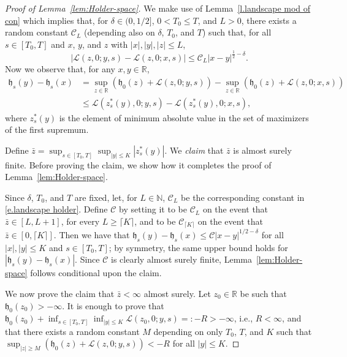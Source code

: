 \documentclass[oneside,final,11pt]{amsart}
\theoremstyle{definition}
\newcommand{\fh}{\mathfrak{h}}
\newcommand{\R}{\mathbb{R}}
\newcommand{\nn}{\mathbb{N}}
\newcommand{\N}{\nn}
\newcommand{\1}[1]{\mathbf{1}_{#1}}
\newcommand{\mc}{\mathcal}
\numberwithin{equation}{section}
\begin{document}
\begin{proof}[Proof of Lemma~\ref{lem:Holder-space}]
We make use of Lemma~\ref{l.landscape mod of con} which implies that, for $\delta \in (0,1/2]$,  $0< T_0 \leq T$, and  $L>0$, there exists a random constant $\mc C_L$ (depending also on $\delta$, $T_0$, and $T$) such that, for all $s\in[T_0,T]$ and  $x$, $y$, and $z$ with $|x|, |y|, |z| \leq L$,
%
\begin{equation}\label{e.landscape holder}
|\mc L(z,0; y, s) - \mc L(z, 0; x, s)| \leq \mc C_L|x-y|^{\frac{1}{2}-\delta}.
\end{equation}
%
Now we observe that, for any $x,y\in\R$,
%
\begin{align*}
\fh_s(y) - \fh_s(x) &= \sup_{z\in\R} \left(\fh_0(z) + \mc L(z,0;y,s)\right) - \sup_{z\in\R}\left(\fh_0(z) + \mc L(z,0;x,s)\right)\\
%
&\leq \mc L(z_s^*(y), 0; y,s) - \mc L(z_s^*(y), 0; x,s),
\end{align*}
%
where $z_s^*(y)$ is the element of minimum absolute value in the set of maximizers of the first supremum.

Define $\bar z = \sup_{s\in[T_0, T]}\sup_{|y|\leq K} |z_s^*(y)|$. We {\em claim} that $\bar z$ is almost surely finite. Before proving the claim, we show how it completes the proof of Lemma~\ref{lem:Holder-space}.

Since $\delta$, $T_0$, and $T$ are fixed, let, for $L\in\N$, $\mc C_L$ be the corresponding constant in \eqref{e.landscape holder}. Define $\mc C$ by setting it to be $\mc C_L$ on the event that $\bar z\in [L, L+1]$, for every $L\geq \lceil K \rceil$, and to be $\mc C_{\lceil K\rceil}$ on the event that $\bar z \in [0, \lceil K\rceil]$. Then we have that $\fh_s(y) -\fh_s(x) \leq \mc C|x-y|^{1/2-\delta}$ for all $|x|,|y| \leq K$ and $s\in [T_0,T]$; by symmetry, the same upper bound holds for $|\fh_s(y) - \fh_s(x)|$. Since $\mc C$ is clearly almost surely finite, Lemma~\ref{lem:Holder-space} follows conditional upon the claim.

We now prove the claim that $\bar z <\infty$ almost surely. Let $z_0\in\R$ be such that $\fh_0(z_0) > -\infty$. It is enough to prove that $\fh_0(z_0) + \inf_{s\in[T_0,T]}\inf_{|y|\leq K} \mc L(z_0,0;y,s) =: -R > -\infty$, i.e., $R<\infty$, and that there exists a random constant $M$ depending on only $T_0$, $T$, and $K$ such that $\sup_{|z| \geq M} (\fh_0(z)+\mc L(z,0;y,s)) < -R$ for all $|y|\leq K$.


\end{proof}
\end{document}
